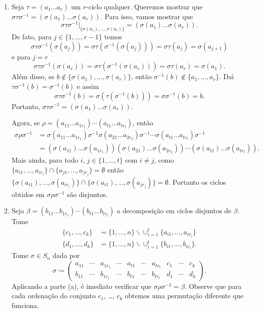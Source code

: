 \begin{prova}
	\begin{enumerate}[label=({\roman*})]
		\item Seja $\tau = (a_1 \dots a_r)$ um $r$-ciclo qualquer. Queremos mostrar que $\sigma\tau\sigma^{-1} = (\sigma(a_1)\dots\sigma(a_r))$. Para isso, vamos mostrar que
		\[
			\sigma\tau\sigma^{-1}|_{\{\sigma(a_1),\dots,\sigma(a_r)\}} = (\sigma(a_1)\dots\sigma(a_r)).
		\]
		De fato, para $j \in \{1, \dots, r - 1\}$ temos
		\[
			\sigma\tau\sigma^{-1}(\sigma(a_j)) = \sigma\tau(\sigma^{-1}(\sigma(a_j))) = \sigma\tau(a_j) = \sigma(a_{j + 1})
		\]
		e para $j = r$
		\[
			\sigma\tau\sigma^{-1}(\sigma(a_r)) = \sigma\tau(\sigma^{-1}(\sigma(a_r))) = \sigma\tau(a_r) = \sigma(a_1).
		\]
		Al\'em disso, se $b \notin \{\sigma(a_1), \dots, \sigma(a_r)\}$, ent\~ao $\sigma^{-1}(b) \notin \{a_1, \dots, a_r\}$. Da{\'\i} $\tau\sigma^{-1}(b) = \sigma^{-1}(b)$ e assim
		\[
			\sigma\tau\sigma^{-1}(b) = \sigma(\tau(\sigma^{-1}(b))) = \sigma\sigma^{-1}(b) = b.
		\]
		Portanto, $\sigma\tau\sigma^{-1} = (\sigma(a_1)\dots \sigma(a_r))$.

		Agora, se $\rho = (a_{11}\dots a_{1r_1})\cdots (a_{t1}\dots a_{tr_t})$, ent\~ao
		\begin{align*}
			\sigma\rho\sigma^{-1} &= \sigma(a_{11}\dots a_{1r_1})\sigma^{-1}\sigma(a_{21}\dots a_{2r_2})\sigma^{-1}\cdots \sigma(a_{t1}\dots a_{tr_t})\sigma^{-1}\\ &= (\sigma(a_{11})\dots \sigma(a_{1r_1}))(\sigma(a_{21})\dots \sigma(a_{2r_2}))\cdots (\sigma(a_{t1})\dots \sigma(a_{tr_t})).
		\end{align*}
		Mais ainda, para todo $i$, $j \in \{1, \dots, t\}$ com $i \ne j$, como $\{a_{i1}, \dots, a_{ir_i}\} \cap \{a_{j1}, \dots, a_{jr_j}\} = \emptyset$ ent\~ao $\{\sigma(a_{i1}), \dots, \sigma(a_{ir_i})\} \cap \{\sigma(a_{i1}), \dots, \sigma(a_{jr_j})\} = \emptyset$. Portanto os ciclos obtidos em $\sigma\rho\sigma^{-1}$ s\~ao disjuntos.

		\item Seja $\beta = (b_{11}\dots b_{1r_1})\cdots (b_{t1}\dots b_{tr_t})$ a decomposi\c{c}\~ao em ciclos disjuntos de $\beta$. Tome
		\begin{align*}
			\{c_1, \dots, c_k\} &= \{1, \dots, n\}\backslash \cup_{i = 1}^t\{a_{i1}, \dots, a_{ir_i}\}\\
			\{d_1, \dots, d_k\} &= \{1, \dots, n\}\backslash \cup_{i = 1}^t\{b_{i1}, \dots, b_{ir_i}\}.
		\end{align*}
		Tome $\sigma \in S_n$ dada por
		\[
			\sigma \coloneqq \begin{pmatrix}
				a_{11} & \cdots & a_{1r_1} & \cdots & a_{t1} & \cdots  & a_{tr_t} & c_1 & \cdots & c_k\\
				b_{11} & \cdots & b_{1r_1} & \cdots & b_{t1} & \cdots & b_{tr_t} & d_1 & \cdots & d_k
			\end{pmatrix}.
		\]
		Aplicando a parte (a), \'e imediato verificar que $\sigma\rho\sigma^{-1} = \beta$. Observe que para cada ordena\c{c}\~ao do conjunto $c_1$, \dots, $c_k$ obtemos uma permuta\c{c}\~ao diferente que funciona.


\end{enumerate}
\end{prova}
